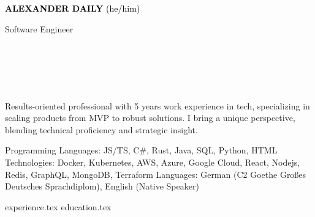 \documentclass[11pt]{developercv} %
\begin{document}

\begin{minipage}[t]{0.4\textwidth} 
	\vspace{-\baselineskip} %
	
  { \fontsize{16}{20} \textcolor{black}{\textbf{\MakeUppercase{Alexander Daily}} (he/him)}} %
	
	\vspace{6pt}
	
	{\Large Software Engineer} %
\end{minipage}
\hfill
\begin{minipage}[t]{0.35\textwidth} %
	\vspace{-\baselineskip} %
	
  	\\	
    \\
    \\
    \\    
    
\end{minipage}

  Results-oriented professional with 5 years work experience in tech, specializing in scaling products from MVP to robust solutions. I bring a unique perspective, blending technical proficiency and strategic insight.
	\vspace{-8pt}

    \vspace{-6pt}

\begin{entrylist}
      \entry 
      {Programming Languages:}
      {JS/TS, C\#, Rust, Java, SQL, Python, HTML}
      {}
      {}\\
      \entry 
      {Technologies:}
      {Docker, Kubernetes, AWS, Azure, Google Cloud, React, Nodejs, Redis, GraphQL, MongoDB, Terraform}
      {}
      {}
      \entry 
      {Languages:}
      {German (C2 Goethe Großes Deutsches Sprachdiplom), English (Native Speaker)}
      {}
      {}
\end{entrylist}
    
{experience.tex}
{education.tex}
\end{document}
